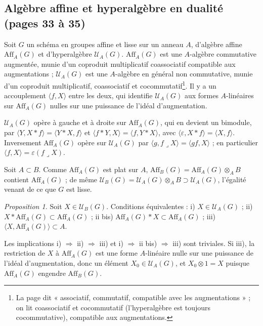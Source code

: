 \documentclass[11pt,a4paper]{article}
\begin{document}
\subsection*{Algèbre affine et hyperalgèbre en dualité (pages 33 à 35)}

Soit $G$ un schéma en groupes affine et lisse sur un anneau $A$, d'algèbre
affine $\mathrm{Aff}_A(G)$ et d'hyperalgèbre $\mathcal{U}_A(G)$.
$\mathrm{Aff}_A(G)$ est une $A$-algèbre commutative augmentée, munie d'un
coproduit multiplicatif coassociatif compatible aux augmentations ;
$\mathcal{U}_A(G)$ est une $A$-algèbre en général non commutative, munie d'un
coproduit multiplicatif, coassociatif et cocommutatif\footnote{La page dit
« associatif, commutatif, compatible avec les augmentations » ; on lit coassociatif et
cocommutatif (l'hyperalgèbre est toujours cocommutative), compatible aux
augmentations.}. Il y a un accouplement $\langle f, X \rangle$ entre les deux, qui
identifie $\mathcal{U}_A(G)$ aux formes $A$-linéaires sur $\mathrm{Aff}_A(G)$
nulles sur une puissance de l'idéal d'augmentation.

$\mathcal{U}_A(G)$ opère à gauche et à droite sur $\mathrm{Aff}_A(G)$, qui en
devient un bimodule, par $\langle Y, X * f \rangle = \langle Y * X, f \rangle$ et
$\langle f * Y, X \rangle = \langle f, Y * X \rangle$, avec $\langle \varepsilon,
X * f \rangle = \langle X, f \rangle$. Inversement $\mathrm{Aff}_A(G)$ opère sur
$\mathcal{U}_A(G)$ par $\langle g, f \lrcorner X \rangle = \langle gf, X \rangle$ ;
en particulier $\langle f, X \rangle = \varepsilon(f \lrcorner X)$.

Soit $A \subset B$. Comme $\mathrm{Aff}_A(G)$ est plat sur $A$,
$\mathrm{Aff}_B(G) = \mathrm{Aff}_A(G) \otimes_A B$ contient $\mathrm{Aff}_A(G)$ ;
de même $\mathcal{U}_B(G) = \mathcal{U}_A(G) \otimes_A B \supset \mathcal{U}_A(G)$,
l'égalité venant de ce que $G$ est lisse.

\emph{Proposition 1.} Soit $X \in \mathcal{U}_B(G)$. Conditions équivalentes :
i) $X \in \mathcal{U}_A(G)$ ; ii) $X * \mathrm{Aff}_A(G) \subset \mathrm{Aff}_A(G)$ ;
ii bis) $\mathrm{Aff}_A(G) * X \subset \mathrm{Aff}_A(G)$ ; iii)
$\langle X, \mathrm{Aff}_A(G) \rangle \subset A$.

Les implications i) $\Rightarrow$ ii) $\Rightarrow$ iii) et i) $\Rightarrow$
ii bis) $\Rightarrow$ iii) sont triviales. Si iii), la restriction de $X$ à
$\mathrm{Aff}_A(G)$ est une forme $A$-linéaire nulle sur une puissance de
l'idéal d'augmentation, donc un élément $X_0 \in \mathcal{U}_A(G)$, et $X_0
\otimes 1 = X$ puisque $\mathrm{Aff}_A(G)$ engendre $\mathrm{Aff}_B(G)$.
\end{document}
